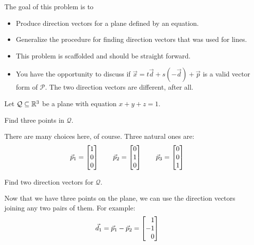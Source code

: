 \documentclass{workbook}
\newcommand{\bookonlynewpage}{\begin{bookonly}\newpage\end{bookonly}}
\begin{document}
\begin{slide}
	\bookonlynewpage
	\question
	\label{ProbPlane}
	\begin{annotation}
		\begin{goals}

			The goal of this problem is to
			\begin{itemize}
				\item Produce direction vectors for a plane defined by
					an equation.
				\item Generalize the procedure for finding direction
					vectors that was used for lines.
			\end{itemize}
		\end{goals}

		\begin{notes}
			\begin{itemize}
				\item This problem is scaffolded and should be straight forward.
				\item You have the opportunity to discuss if $\vec x=t\vec d+s(-\vec d)+\vec p$
					is a valid vector form of $\mathcal P$. The two direction vectors
					are different, after all.
			\end{itemize}
		\end{notes}
	\end{annotation}
	Let $\mathcal Q\subseteq \mathbb{R}^3$ be a plane with equation $x+y+z=1$.
	\begin{parts}
		\item Find three points in $\mathcal Q$.
			\begin{solution}
				There are many choices here, of course. Three natural ones are:
				\[
					\vec p_1 = \mat{1\\0\\0}
					\qquad
					\vec p_2 = \mat{0\\1\\0}
					\qquad
					\vec p_3 = \mat{0\\0\\1}
				\]
			\end{solution}
		\item Find two direction vectors for $\mathcal Q$.
			\begin{solution}
				Now that we have three points on the plane, we can use the
				direction vectors joining any two pairs of them. For example:
				\[
					\vec d_1 = \vec p_1 - \vec p_2 = \mat{1\\-1\\0}
\]
\end{solution}
\end{parts}
\end{slide}
\end{document}
